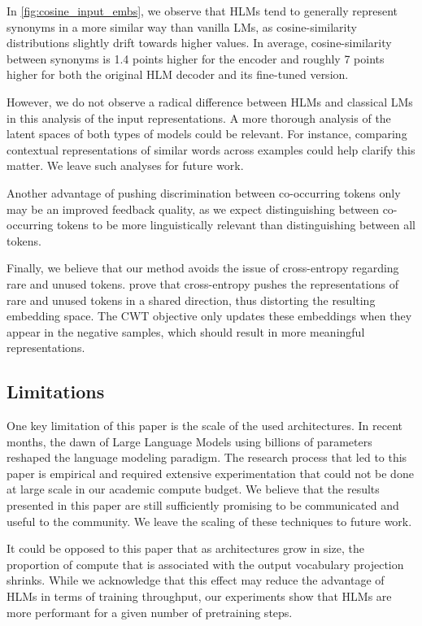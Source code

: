 In \autoref{fig:cosine_input_embs}, we observe that HLMs tend to generally represent synonyms in a more similar way than vanilla LMs, as cosine-similarity distributions slightly drift towards higher values. In average, cosine-similarity between synonyms is 1.4 points higher for the encoder and roughly 7 points higher for both the original HLM decoder and its fine-tuned version.

However, we do not observe a radical difference between HLMs and classical LMs in this analysis of the input representations. A more thorough analysis of the latent spaces of both types of models could be relevant. For instance, comparing contextual representations of similar words across examples could help clarify this matter. We leave such analyses for future work.

Another advantage of pushing discrimination between co-occurring tokens only may be an improved feedback quality, as we expect distinguishing between co-occurring tokens to be more linguistically relevant than distinguishing between all tokens.

Finally, we believe that our method avoids the issue of cross-entropy regarding rare and unused tokens. \citet{gao19} prove that cross-entropy pushes the representations of rare and unused tokens in a shared direction, thus distorting the resulting embedding space. The CWT objective only updates these embeddings when they appear in the negative samples, which should result in more meaningful representations.

\subsection{Limitations}
One key limitation of this paper is the scale of the used architectures. In recent months, the dawn of Large Language Models using billions of parameters reshaped the language modeling paradigm. The research process that led to this paper is empirical and required extensive experimentation that could not be done at large scale in our academic compute budget. We believe that the results presented in this paper are still sufficiently promising to be communicated and useful to the community. We leave the scaling of these techniques to future work.

It could be opposed to this paper that as architectures grow in size, the proportion of compute that is associated with the output vocabulary projection shrinks. While we acknowledge that this effect may reduce the advantage of HLMs in terms of training throughput, our experiments show that HLMs are more performant for a given number of pretraining steps.

